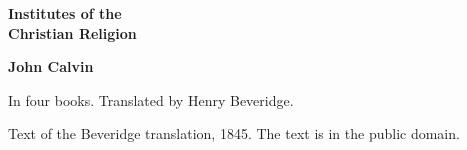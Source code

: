 \documentclass[11pt,letterpaper]{article}
\begin{document}
\color{ink}

\begin{titlepage}
\centering
\vspace*{4em}
{\LARGE\bfseries\color{heading} Institutes of the\\[0.3em]Christian Religion\par}
\vspace{2em}
{\Large\bfseries\color{heading} John Calvin\par}
\vspace{2.5em}
{\itshape\color{subhead}\parbox{0.8\linewidth}{\centering In four books. Translated by Henry Beveridge.\par}}
\vfill
{\small Text of the Beveridge translation, 1845. The text is in the public domain.\par}
\vspace{2em}
\end{titlepage}

\tableofcontents


\end{document}
